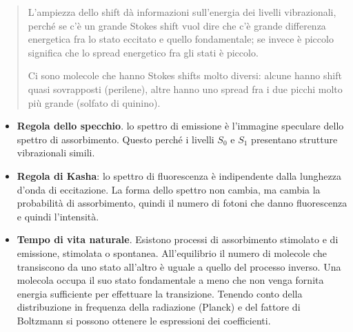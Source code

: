\begin{quote}
L'ampiezza dello shift dà informazioni sull'energia dei livelli
vibrazionali, perché se c'è un grande Stokes shift vuol dire che c'è
grande differenza energetica fra lo stato eccitato e quello
fondamentale; se invece è piccolo significa che lo spread energetico fra
gli stati è piccolo.

Ci sono molecole che hanno Stokes shifts molto diversi: alcune hanno
shift quasi sovrapposti (perilene), altre hanno uno spread fra i due
picchi molto più grande (solfato di quinino).
\end{quote}

\begin{itemize}
\item
  \textbf{Regola dello specchio}. lo spettro di emissione è l'immagine
  speculare dello spettro di assorbimento. Questo perché i livelli
  \(S_{0}\) e \(S_{1}\) presentano strutture vibrazionali simili.
\item
  \textbf{Regola di Kasha}: lo spettro di fluorescenza è indipendente
  dalla lunghezza d'onda di eccitazione. La forma dello spettro non
  cambia, ma cambia la probabilità di assorbimento, quindi il numero di
  fotoni che danno fluorescenza e quindi l'intensità.
\item
  \textbf{Tempo di vita naturale}. Esistono processi di assorbimento
  stimolato e di emissione, stimolata o spontanea. All'equilibrio il
  numero di molecole che transiscono da uno stato all'altro è uguale a
  quello del processo inverso. Una molecola occupa il suo stato
  fondamentale a meno che non venga fornita energia sufficiente per
  effettuare la transizione. Tenendo conto della distribuzione in
  frequenza della radiazione (Planck) e del fattore di Boltzmann si
  possono ottenere le espressioni dei coefficienti.
\end{itemize}

